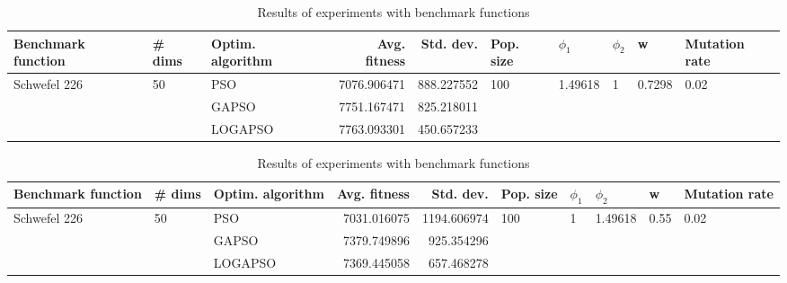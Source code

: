 \documentclass{article}
\begin{document}
\begin{table}
\centering
\caption{Results of experiments with benchmark functions}
\begin{tabular}{lllrrlllll}
\toprule
           Benchmark function &             \# dims & Optim. algorithm &  Avg. fitness &  Std. dev. &            Pop. size &               $\phi_{1}$ &         $\phi_{2}$ &                       w &         Mutation rate \\
\midrule
\multirow{3}{*}{Schwefel 226} & \multirow{3}{*}{50} &              PSO &   7076.906471 & 888.227552 & \multirow{3}{*}{100} & \multirow{3}{*}{1.49618} & \multirow{3}{*}{1} & \multirow{3}{*}{0.7298} & \multirow{3}{*}{0.02} \\
                              &                     &            GAPSO &   7751.167471 & 825.218011 &                      &                          &                    &                         &                       \\
                              &                     &          LOGAPSO &   7763.093301 & 450.657233 &                      &                          &                    &                         &                       \\
\bottomrule
\end{tabular}
\end{table}
\begin{table}
\centering
\caption{Results of experiments with benchmark functions}
\begin{tabular}{lllrrlllll}
\toprule
           Benchmark function &             \# dims & Optim. algorithm &  Avg. fitness &   Std. dev. &            Pop. size &         $\phi_{1}$ &               $\phi_{2}$ &                     w &         Mutation rate \\
\midrule
\multirow{3}{*}{Schwefel 226} & \multirow{3}{*}{50} &              PSO &   7031.016075 & 1194.606974 & \multirow{3}{*}{100} & \multirow{3}{*}{1} & \multirow{3}{*}{1.49618} & \multirow{3}{*}{0.55} & \multirow{3}{*}{0.02} \\
                              &                     &            GAPSO &   7379.749896 &  925.354296 &                      &                    &                          &                       &                       \\
                              &                     &          LOGAPSO &   7369.445058 &  657.468278 &                      &                    &                          &                       &                       \\
\bottomrule
\end{tabular}
\end{table}
\end{document}
